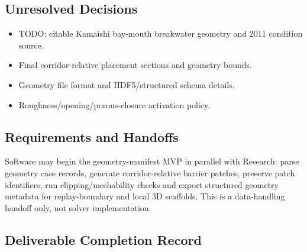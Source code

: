 \subsection{Unresolved Decisions}
\label{sec:res-geo-spec-unresolved-decisions}

\begin{itemize}
  \item TODO: citable Kamaishi bay-mouth breakwater geometry and 2011
    condition source.
  \item Final corridor-relative placement sections and geometry bounds.
  \item Geometry file format and HDF5/structured schema details.
  \item Roughness/opening/porous-closure activation policy.
\end{itemize}

\subsection{Requirements and Handoffs}
\label{sec:res-geo-spec-requirements}

Software may begin the geometry-manifest MVP in parallel with
Research: parse geometry case records, generate corridor-relative
barrier patches, preserve patch identifiers, run clipping/meshability
checks and export structured geometry metadata for replay-boundary
and local 3D scaffolds. This is a data-handling handoff only, not
solver implementation.

\subsection{Deliverable Completion Record}
\label{sec:res-geo-spec-completion-record}

%
%
%
